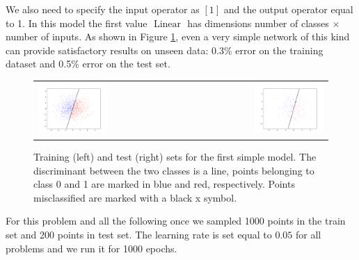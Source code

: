 \documentclass{article}
\begin{document}
We also need to specify the input operator as $[1]$ and the output operator equal to 1. 
In this model the first value $ \text{ Linear }$ has dimensions number of classes $\times$ number of inputs.
As shown in Figure \ref{fig_lin_results}, even a very simple network of this kind can provide satisfactory results on unseen data: 0.3\% error on the training dataset and 0.5\% error on the test set. 
  \begin{figure}[h]
 \begin{center}
\begin{tabular}{l r}
  \includegraphics[width=0.5\textwidth]{fig/fig_linear_simplemodel_03err_train} & 
  \includegraphics[width=0.5\textwidth]{fig/fig_linear_simplemodel_05err_test} \\
  \end{tabular}
   \caption{Training (left) and test (right) sets for the first simple model. 
   The discriminant between the two classes is a line, points belonging to class 0 and 1 are marked in blue and red, respectively. 
   Points misclassified are marked with a black x symbol.  \label{fig_lin_results}}
  \end{center}
  \end{figure}
  
For this problem and all the following once we sampled 1000 points in the train set and 200 points in test set. 
The learning rate is set equal to $0.05$ for all problems and we run it for 1000 epochs. 
\end{document}
